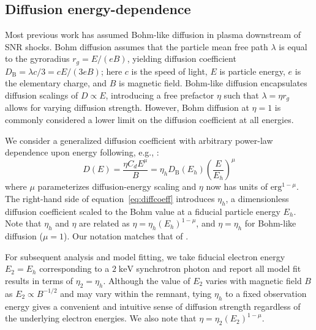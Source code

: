 \documentclass[manuscript]{aastex}  %
\newcommand*{\mt}{\mathrm}
\newcommand*{\unit}[1]{\;\mt{#1}}  %
\begin{document}
\subsection{Diffusion energy-dependence} \label{sec:diffcoeff}

Most previous work has assumed Bohm-like diffusion in plasma downstream of SNR
shocks.  Bohm diffusion assumes that the particle mean free path $\lambda$ is
equal to the gyroradius $r_g = E/(eB)$, yielding diffusion coefficient
$D_{\mt{B}} = \lambda c / 3 = c E / (3 e B)$; here $c$ is the speed of light,
$E$ is particle energy, $e$ is the elementary charge, and $B$ is magnetic
field.  Bohm-like diffusion encapsulates diffusion scalings of $D \propto E$,
introducing a free prefactor $\eta$ such that $\lambda = \eta r_g$ allows for
varying diffusion strength.  However, Bohm diffusion at $\eta = 1$ is commonly
considered a lower limit on the diffusion coefficient at all energies.

We consider a generalized diffusion coefficient with arbitrary
power-law dependence upon energy following, e.g., \citet{parizot2006}:
\begin{equation} \label{eq:diffcoeff}
    D(E) = \frac{\eta C_d E^\mu}{B}
         = \eta_h D_{\mt{B}}\left(E_h\right) \left(\frac{E}{E_h}\right)^\mu
\end{equation}
where $\mu$ parameterizes diffusion-energy scaling and $\eta$ now has units
of $\mt{erg}^{1-\mu}$.  The right-hand side of equation~\eqref{eq:diffcoeff}
introduces $\eta_h$, a dimensionless diffusion coefficient scaled to the Bohm
value at a fiducial particle energy $E_h$.  Note that $\eta_h$ and $\eta$ are
related as $\eta = \eta_h (E_h)^{1-\mu}$, and $\eta = \eta_h$ for Bohm-like
diffusion ($\mu = 1$).  Our notation matches that of .

For subsequent analysis and model fitting, we take fiducial electron energy
$E_2 = E_h$ corresponding to a $2 \unit{keV}$ synchrotron photon and report all
model fit results in terms of $\eta_2 = \eta_h$.  Although the value of $E_2$
varies with magnetic field $B$ as $E_2 \propto B^{-1/2}$ and may vary within
the remnant, tying $\eta_h$ to a fixed observation energy gives a convenient
and intuitive sense of diffusion strength regardless of the underlying electron
energies.  We also note that $\eta = \eta_2 (E_2)^{1-\mu}$.
\end{document}
